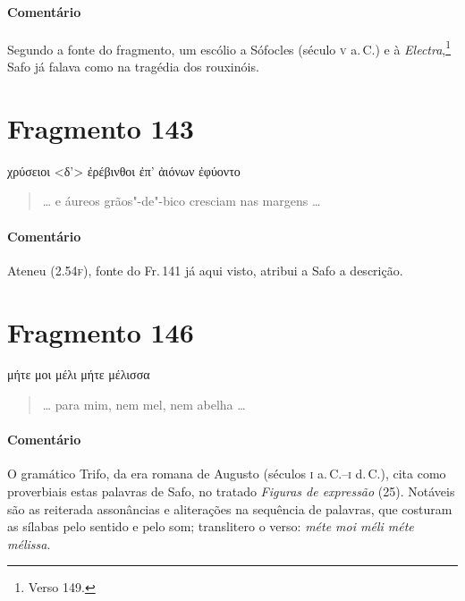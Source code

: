 \medskip

\paragraph{Comentário} Segundo a fonte do fragmento, um escólio a Sófocles (século \textsc{v} a.\,C.) e à \emph{Electra},\footnote{Verso 149.} Safo já falava como na tragédia dos
rouxinóis.


\section{Fragmento 143}

\begin{gkverse}
χρύσειοι <δ’> ἐρέβινθοι ἐπ’ ἀιόνων ἐφύοντο
\end{gkverse}

\begin{verse}
\ldots{} e áureos grãos"-de"-bico cresciam nas margens \ldots{}
\end{verse}

\medskip

{\paragraph{Comentário} Ateneu (2.54\textsc{f}), fonte do Fr.\,141 já aqui visto, atribui a Safo a descrição.}


\section{Fragmento 146}

\begin{gkverse}
μήτε μοι μέλι μήτε μέλισσα
\end{gkverse}

\begin{verse}
\ldots{} para mim, nem mel, nem abelha \ldots{}
\end{verse}

\medskip


\paragraph{Comentário} O gramático Trifo, da era romana de Augusto (séculos \textsc{i} a.\,C.--\textsc{i} d.\,C.), 
cita como proverbiais estas palavras de Safo, no tratado \emph{Figuras de expressão} (25).
Notáveis são as reiterada assonâncias e aliterações na sequência de palavras, que costuram as sílabas pelo sentido e pelo som; translitero o verso: \emph{méte moi méli méte mélissa}.

